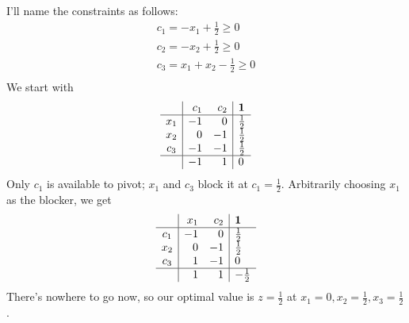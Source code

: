 \documentclass[12pt]{article}
\begin{document}
\begin{enumerate}
            I'll name the constraints as follows:
            \begin{gather*}
                  c_1=-x_1+\frac{1}{2} \ge 0 \\
                  c_2=-x_2+\frac{1}{2} \ge 0 \\
                  c_3=x_1+x_2-\frac{1}{2} \ge 0 \\
            \end{gather*}
            We start with
            \[\begin{array}{c|rr|l}
                            & c_1 & c_2 & \mathbf{1}  \\ \hline
                        x_1 & -1  & 0   & \frac{1}{2} \\
                        x_2 & 0   & -1  & \frac{1}{2} \\
                        c_3 & -1  & -1  & \frac{1}{2} \\ \hline
                            & -1  & 1   & 0           \\
                  \end{array}\]
            Only $c_1$ is available to pivot; $x_1$ and $c_3$ block it at $c_1=\frac{1}{2}$.
            Arbitrarily choosing $x_1$ as the blocker, we get
            \[\begin{array}{c|rr|l}
                            & x_1 & c_2 & \mathbf{1}   \\ \hline
                        c_1 & -1  & 0   & \frac{1}{2}  \\
                        x_2 & 0   & -1  & \frac{1}{2}  \\
                        c_3 & 1  & -1  & 0            \\ \hline
                            & 1  & 1   & -\frac{1}{2} \\
                  \end{array}\]
            There's nowhere to go now, so our optimal value is $z=\frac{1}{2}$
            at $x_1=0, x_2=\frac{1}{2}, x_3=\frac{1}{2}$.

            \pagebreak


\end{enumerate}
\end{document}

